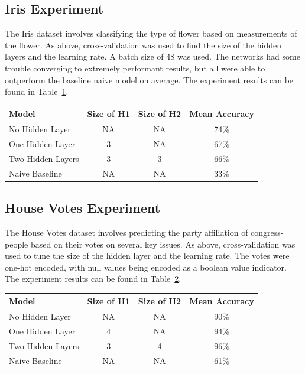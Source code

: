 \documentclass{amsart}
\begin{document}
    \subsection*{Iris Experiment}
    The Iris dataset\cite{irisdataset} involves classifying the type of flower based on measurements
    of the flower. As above, cross-validation was used to find the size of the hidden layers and the learning
    rate. A batch size of 48 was used. The networks had some trouble converging to extremely
    performant results, but all were able to outperform the baseline naive model on average.
    The experiment results can be found in Table~\ref{iris_results}.
    \begin{table}[H]
    \begin{tabular}{lccc}
    Model & Size of H1 & Size of H2 & Mean Accuracy \\
    \hline
    No Hidden Layer & NA & NA & 74\% \\
    One Hidden Layer & 3 & NA & 67\% \\
    Two Hidden Layers & 3 & 3 & 66\% \\
    Naive Baseline & NA & NA & 33\%
    \end{tabular}
    \label{iris_results}
    \end{table}

    \subsection*{House Votes Experiment}
    The House Votes dataset\cite{housedataset}
    involves predicting the party
    affiliation of congress-people based on their votes on several key
    issues. As above, cross-validation was used to tune the size of the
    hidden layer and the learning rate. The votes were
    one-hot encoded, with null values being encoded as a boolean
    value indicator.
    The experiment results can be found in Table~\ref{house_results}.
    \begin{table}[H]
    \begin{tabular}{lccc}
    Model & Size of H1 & Size of H2 & Mean Accuracy \\
    \hline
    No Hidden Layer & NA & NA & 90\% \\
    One Hidden Layer & 4 & NA & 94\% \\
    Two Hidden Layers & 3 & 4 & 96\% \\
    Naive Baseline & NA & NA & 61\%
    \end{tabular}
    \label{house_results}
    \end{table}
\end{document}
